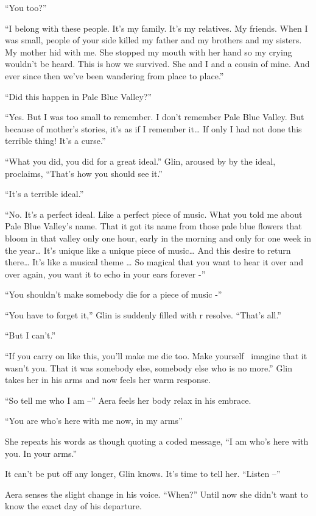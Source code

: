 \documentclass[twoside,11pt]{book}
\begin{document}
``You too?''

``I belong with these people. It's my family. It's my relatives. My friends. When I was small, people of
your side killed my father and my brothers and my sisters. My mother hid with me. She stopped my mouth with her hand so
my crying wouldn't be heard. This is how we survived. She and I and a cousin of mine. And ever since then we've been
wandering from place to place.''

``Did this happen in Pale Blue Valley?''

``Yes. But I was too small to remember. I don't remember Pale Blue Valley.  But because of mother's
stories, it's as if I remember it{\dots} If only I had not done this terrible thing! It's a curse.''

``What you did, you did for a great ideal.'' Glin, aroused by by the ideal, proclaims,
``That's how you should see it.''

``It's a terrible ideal.''

``No. It's a perfect ideal. Like a perfect piece of music. What you told me about Pale Blue Valley's name.
That it got its name from those pale blue flowers that bloom in that valley only one hour, early in the morning and
only for one week in the year{\dots} It's unique like a unique piece of music{\ldots} And this desire to return there{\dots}
It's like a musical theme {\dots} So magical that you want to hear it over and over again, you want it to echo in your
ears forever -''

``You shouldn't make somebody die for a piece of music -''

``You have to forget it,'' Glin is suddenly filled with r resolve. ``That's
all.''

``But I can't.''

``If you carry on like this, you'll make me die too. Make yourself
\ imagine that it wasn't you. That it was somebody else, somebody else who is no more.'' Glin takes her
in his arms and now feels her warm response.

``So tell me who I am --'' Aera feels her body relax in his embrace.

``You are who's here with me now, in my arms''

She repeats his words as though quoting a coded message, ``I am who's here with you. In your
arms.''

It can't be put off any longer, Glin knows. It's time to tell her. ``Listen --''

Aera senses the slight change in his voice. ``When?'' Until now she didn't want to know the
exact day of his departure.
\end{document}
